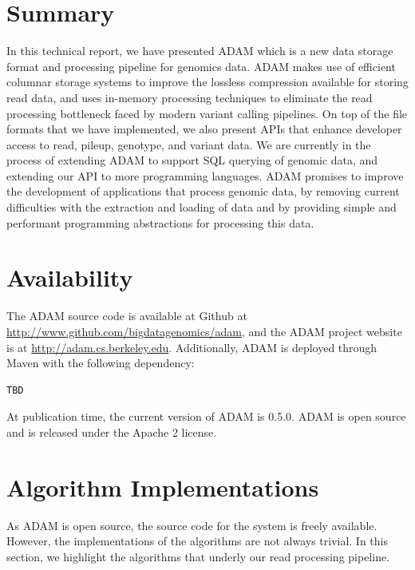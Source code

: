 \documentclass[10pt,twocolumn]{article}
\theoremstyle{plain}
\begin{document}
\section{Summary}
\label{sec:summary}

In this technical report, we have presented ADAM which is a new data storage format and processing pipeline for
genomics data. ADAM makes use of efficient columnar storage systems to improve the lossless compression available
for storing read data, and uses in-memory processing techniques to eliminate the read processing bottleneck faced
by modern variant calling pipelines. On top of the file formats that we have implemented, we also present APIs that enhance
developer access to read, pileup, genotype, and variant data. We are currently in the process of extending ADAM to
support SQL querying of genomic data, and extending our API to more programming languages. ADAM promises
to improve the development of applications that process genomic data, by removing current difficulties with the extraction
and loading of data and by providing simple and performant programming abstractions for processing this data.

\appendix

\section{Availability}
\label{sec:availability}

The ADAM source code is available at Github at \url{http://www.github.com/bigdatagenomics/adam}, and the ADAM project website
is at \url{http://adam.cs.berkeley.edu}. Additionally, ADAM is deployed through Maven with the following dependency:

\begin{verbatim}
TBD
\end{verbatim}

At publication time, the current version of ADAM is 0.5.0. ADAM is open source and is released under the Apache 2
license.

\section{Algorithm Implementations}
\label{sec:algorithm-implentations}

As ADAM is open source, the source code for the system is freely available. However, the implementations of the algorithms
are not always trivial. In this section, we highlight the algorithms that underly our read processing pipeline.
\end{document}
